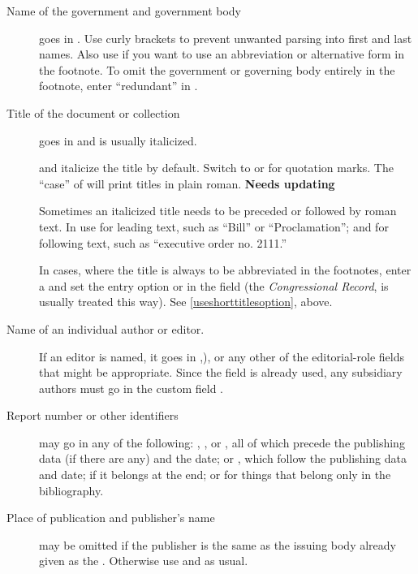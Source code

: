 \documentclass{ltxdockit}[2010/02/12]
\begin{document}
{\begin{description}
\item[Name of the government and government body] goes in . Use curly brackets to prevent unwanted parsing into first and last names. Also use  if you want to use an abbreviation or alternative form in the footnote. To omit the government or governing body entirely in the footnote, enter ``redundant'' in .

\item [Title of the document or collection] goes in  and is usually italicized. 

 and  italicize the title by default. Switch to  or  for quotation marks. The  ``case'' of  will print titles in plain roman. \textbf{Needs updating}

Sometimes an italicized title needs to be preceded or followed by roman text. In use  for leading text, such as ``Bill'' or ``Proclamation''; and  for following text, such as ``executive order no. 2111.'' 

In cases, where the title is always to be abbreviated in the footnotes, enter a  and set the entry option  or  in the  field (the \emph{Congressional Record}, \eg is usually treated this way). See \ref{useshorttitlesoption}, above.

\item [Name of an individual author or editor.] If an editor is named, it goes in ,), or any other of the editorial-role fields that might be appropriate. Since the  field is already used, any subsidiary authors must go in the custom field .

\item[Report number or other identifiers] may go in any of the following:  , , or , all of which precede the publishing data (if there are any) and the date;  or , which follow the publishing data and date;  if it belongs at the end; or  for things that belong only in the bibliography.

\item[Place of publication and publisher's name] may be omitted if the publisher is the same as the issuing body already given as the . Otherwise use  and  as usual.


\end{description}}
\end{document}
